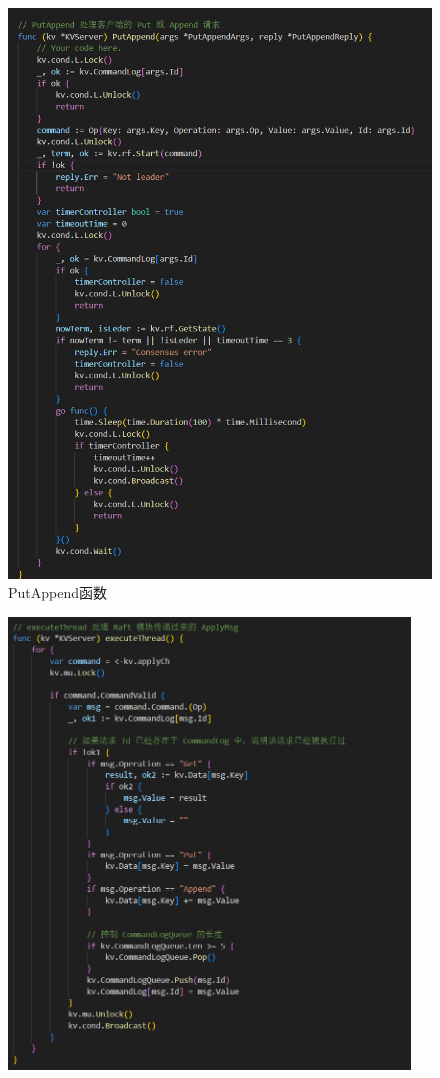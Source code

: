 \documentclass[]{article}
\begin{document}
\begin{itemize}
\begin{figure}[H]
			\includegraphics[height=0.95\textheight]{./3A/server-PutAppend.png}
			\caption{PutAppend函数}
		\end{figure}
		\begin{figure}[H]
			\centering
			\includegraphics[width=0.95\textwidth]{./3A/executeThread.png}

\end{figure}
\end{itemize}
\end{document}
